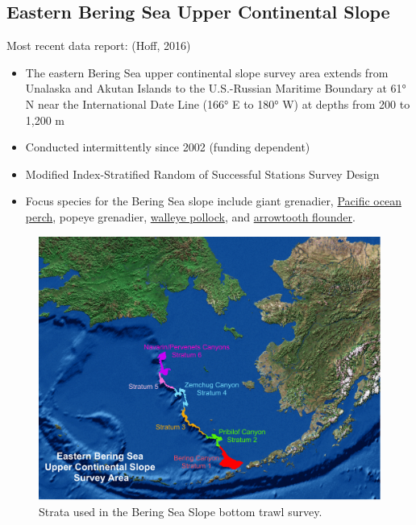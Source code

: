 \documentclass[
  letterpaper,
  oneside,
  open=any]{scrbook}
\providecommand{\tightlist}{%
  \setlength{\itemsep}{0pt}\setlength{\parskip}{0pt}}\usepackage{longtable,booktabs,array}
\begin{document}
\subsection{\texorpdfstring{\textbf{Eastern Bering Sea Upper Continental
Slope}}{Eastern Bering Sea Upper Continental Slope}}\label{eastern-bering-sea-upper-continental-slope}

Most recent data report: (Hoff, 2016)

\begin{itemize}
\tightlist
\item
  The eastern Bering Sea upper continental slope survey area extends
  from Unalaska and Akutan Islands to the U.S.-Russian Maritime Boundary
  at 61° N near the International Date Line (166° E to 180° W) at depths
  from 200 to 1,200 m
\item
  Conducted intermittently since 2002 (funding dependent)
\item
  Modified Index-Stratified Random of Successful Stations Survey Design
\item
  Focus species for the Bering Sea slope include giant grenadier,
  \href{https://www.fisheries.noaa.gov/species/pacific-ocean-perch}{Pacific
  ocean perch}, popeye grenadier,
  \href{https://www.fisheries.noaa.gov/species/alaska-pollock}{walleye
  pollock}, and
  \href{https://www.fisheries.noaa.gov/species/arrowtooth-flounder}{arrowtooth
  flounder}.
\end{itemize}

\begin{figure}[H]

{\centering \includegraphics[width=7.33in,height=\textheight]{content/../img/bss-strata.png}

}

\caption{Strata used in the Bering Sea Slope bottom trawl survey.}

\end{figure}%
\end{document}
